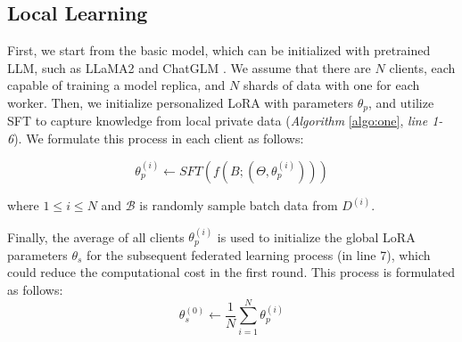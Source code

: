 \documentclass[sigconf]{acmart}
\begin{document}
\subsection{Local Learning}
\par
First, we start from the basic model, which can be initialized with pretrained LLM, such as LLaMA2 \cite{touvron2023llama} and ChatGLM \cite{du2022glm, zeng2022glm}. We assume that there are $N$ clients, each capable of training a model replica, and $N$ shards of data with one for each worker. Then, we initialize personalized LoRA with parameters $\theta_p$, and utilize SFT to capture knowledge from local private data (\textit{Algorithm} \ref{algo:one}, \textit{line 1-6}). We formulate this process in each client as follows:

\begin{equation}
     \theta^{(i)}_{p} \leftarrow SFT(f(B; (\Theta, \theta^{(i)}_{p})))
\end{equation}


where $1 \leq i \leq N$ and $\mathcal{B}$ is randomly sample batch data from $D^{(i)}$.
\par
Finally, the average of all clients $\theta_p^{(i)}$ is used to initialize the global LoRA parameters $\theta_s$ for the subsequent federated learning process (in line 7), which could reduce the computational cost in the first round. This process is formulated as follows:
\begin{equation}
    \theta_{s}^{(0)} \leftarrow \frac{1}{N}\sum_{i=1}^{N} \theta^{(i)}_{p}
\end{equation}
\end{document}
